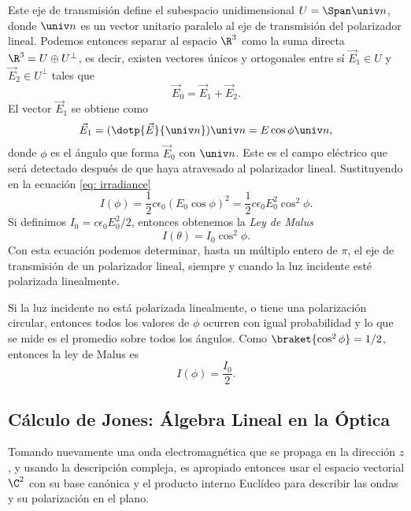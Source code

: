 Este eje de transmisión define el subespacio unidimensional $U = \Span \univ n$, donde $\univ n$ es un vector unitario paralelo al eje de transmisión del polarizador lineal. Podemos entonces separar al espacio $\R^3$ como la suma directa $\R^3 = U\oplus U^{\perp}$, es decir, existen vectores únicos y ortogonales entre sí $\vec E_1 \in U$ y $\vec E_2 \in U^{\perp}$ tales que
\begin{equation}
    \vec E_0 = \vec E_1 + \vec E_2.
\end{equation}
El vector $\vec E_1$ se obtiene como
\begin{equation}\label{eq: proj}
    \vec E_1 = (\dotp{\vec E}{\univ n})\univ n = E\cos\phi \univ n,
\end{equation}
donde $\phi$ es el ángulo que forma $\vec E_0$ con $\univ n$. Este es el campo eléctrico que será detectado después de que haya atravesado al polarizador lineal. Sustituyendo en la ecuación \eqref{eq: irradiance}
\begin{equation}
    I(\phi) = \frac12 c\epsilon_0 (E_0\cos\phi)^2 = \frac12 c\epsilon_0 E_0^2 \cos^2\phi.
\end{equation}
Si definimos $I_0 = c\epsilon_0 E_0^2/2$, entonces obtenemos la \emph{Ley de Malus}
\begin{equation}\label{eq: Malus}
    I(\theta) = I_0 \cos^2\phi.
\end{equation}
Con esta ecuación podemos determinar, hasta un múltiplo entero de $\pi$, el eje de transmisión de un polarizador lineal, siempre y cuando la luz incidente esté polarizada linealmente.

Si la luz incidente no está polarizada linealmente, o tiene una polarización circular, entonces todos los valores de $\phi$ ocurren con igual probabilidad y lo que se mide es el promedio sobre todos los ángulos. Como $\braket{\cos^2 \phi} = 1/2$, entonces la ley de Malus es
\begin{equation}
     I(\phi) = \frac{I_0}{2}.
\end{equation}

\subsection{Cálculo de Jones: Álgebra Lineal en la Óptica}

Tomando nuevamente una onda electromagnética que se propaga en la dirección $z$, y usando la descripción compleja, es apropiado entonces usar el espacio vectorial $\C^2$ con su base canónica y el producto interno Euclídeo para describir las ondas y su polarización en el plano.

